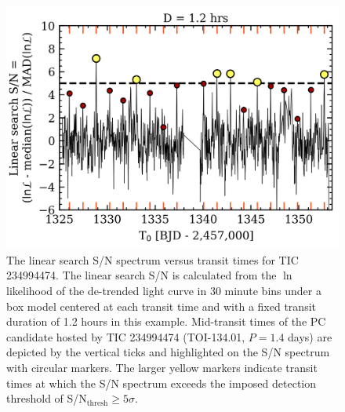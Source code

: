\begin{figure}
  \centering
  \includegraphics[width=0.8\hsize]{figures/linearsearch_234994474.png}
  \caption[Results of the linear search for repeating transit-like events around TIC 234994474.]
          {The linear search S/N spectrum versus transit times for TIC 234994474.
    The linear search S/N is calculated from the $\ln$ likelihood of the de-trended light
    curve in 30 minute bins under a box model centered at each transit time and with a fixed
    transit duration of 1.2 hours in this example. Mid-transit times of the PC candidate
    hosted by TIC 234994474 (TOI-134.01, $P=1.4$ days) are depicted by the vertical ticks
    and highlighted on the S/N spectrum with circular markers. The larger yellow markers
    indicate transit times at which the S/N spectrum exceeds the imposed \pipeline{}
    detection threshold of S/N$_{\text{thresh}}\geq 5\sigma$.}
  \label{fig:linearsearch}
\end{figure}

